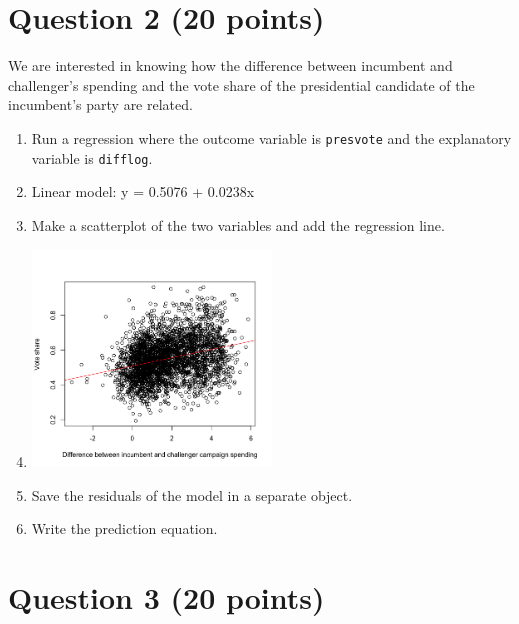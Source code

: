\documentclass[12pt,letterpaper]{article}
\begin{document}
\section*{Question 2 (20 points)}
\noindent We are interested in knowing how the difference between incumbent and challenger's spending and the vote share of the presidential candidate of the incumbent's party are related.	\vspace{.25cm}
	\begin{enumerate}
		\item Run a regression where the outcome variable is \texttt{presvote} and the explanatory variable is \texttt{difflog}.	\vspace{1cm}
		\item[] Linear model: y = 0.5076 + 0.0238x
		
		\item Make a scatterplot of the two variables and add the regression line.
		\item[]
		\includegraphics[width=0.5\textwidth]{Q2.png}
		
		\item Save the residuals of the model in a separate object.	\vspace{1cm}
		
		\item Write the prediction equation.
	\end{enumerate}
	
	\newpage	
\section*{Question 3 (20 points)}
\end{document}
